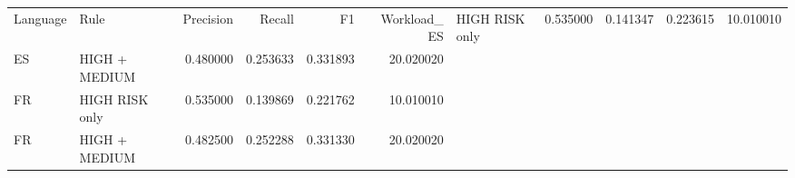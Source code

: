 \begin{tabular}{llrrrr}
\toprule
Language & Rule & Precision & Recall & F1 & Workload_%
\midrule
ES & HIGH RISK only & 0.535000 & 0.141347 & 0.223615 & 10.010010 \\
ES & HIGH + MEDIUM & 0.480000 & 0.253633 & 0.331893 & 20.020020 \\
FR & HIGH RISK only & 0.535000 & 0.139869 & 0.221762 & 10.010010 \\
FR & HIGH + MEDIUM & 0.482500 & 0.252288 & 0.331330 & 20.020020 \\
\bottomrule
\end{tabular}

